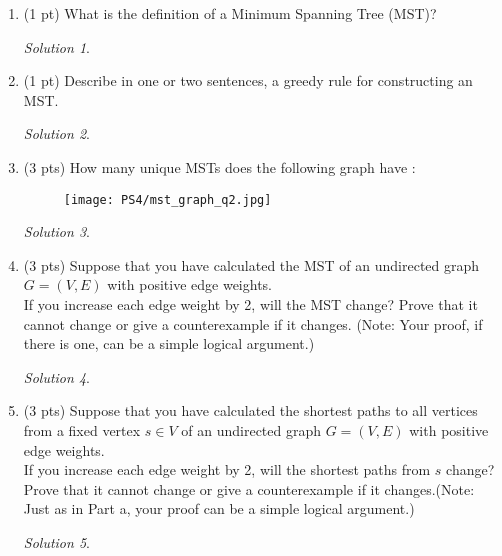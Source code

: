 \documentclass[12pt]{article}
\theoremstyle{remark}
\newtheorem*{solution}{Solution}
\begin{document}
\hrulefill

\newpage
\begin{enumerate}
\item (1 pt) What is the definition of a Minimum Spanning Tree (MST)?
\begin{solution}

\end{solution}
\item (1 pt) Describe in one or two sentences, a greedy rule for constructing an MST.
\begin{solution}

\end{solution}

\item (3 pts) How many unique MSTs does the following graph have :
\begin{figure}[h!]
\begin{center}
\texttt{[image: PS4/mst\_graph\_q2.jpg]} 
\end{center}
\end{figure}


\begin{solution}

\end{solution}

\pagebreak
\item (3 pts) Suppose that you have calculated the MST of an undirected graph $G=(V,E)$ with positive edge weights. \\
If you increase each edge weight by 2, will the MST change? Prove that it cannot change or give a counterexample if it changes. (Note: Your proof, if there is one, can be a simple logical argument.)
\begin{solution}


\end{solution}
\pagebreak

\item (3 pts) Suppose that you have calculated the shortest paths to all vertices from a fixed vertex $s\in V$ of an undirected graph $G=(V,E)$ with positive edge weights. \\
If you increase each edge weight by 2, will the shortest paths from $s$ change? Prove that it cannot change or give a counterexample if it changes.(Note: Just as in Part a, your proof can be a simple logical argument.)
\begin{solution}

\end{solution}

\pagebreak


\end{enumerate}
\end{document}
